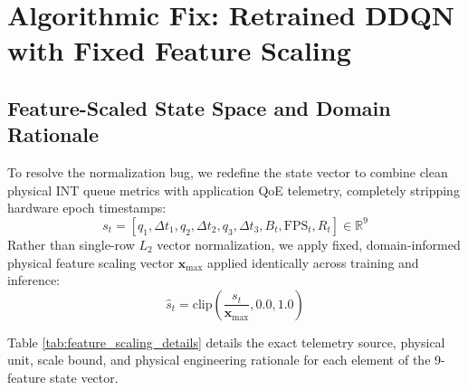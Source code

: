 \documentclass[12pt,a4paper,oneside]{report}
\begin{document}
\section{Algorithmic Fix: Retrained DDQN with Fixed Feature Scaling}

\subsection{Feature-Scaled State Space and Domain Rationale}
To resolve the normalization bug, we redefine the state vector to combine clean physical INT queue metrics with application QoE telemetry, completely stripping hardware epoch timestamps:
\begin{equation}
  s_t = \left[ q_1, \Delta t_1, q_2, \Delta t_2, q_3, \Delta t_3, B_t, \text{FPS}_t, R_t \right] \in \mathbb{R}^9
\end{equation}
Rather than single-row $L_2$ vector normalization, we apply fixed, domain-informed physical feature scaling vector $\mathbf{x}_{\max}$ applied identically across training and inference:
\begin{equation}
  \hat{s}_t = \text{clip}\left(\frac{s_t}{\mathbf{x}_{\max}}, 0.0, 1.0\right)
  \label{eq:fixed_scaling}
\end{equation}

Table \ref{tab:feature_scaling_details} details the exact telemetry source, physical unit, scale bound, and physical engineering rationale for each element of the 9-feature state vector.
\end{document}
